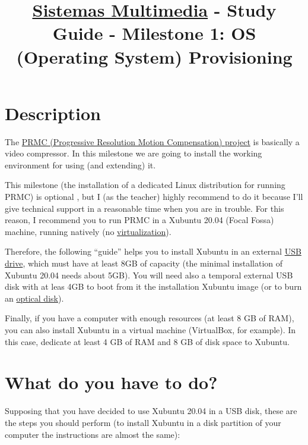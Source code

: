 \title{\href{http://cms.ual.es/UAL/estudios/masteres/plandeestudios/asignaturas/asignatura/MASTER7114?idAss=71142105&idTit=7114}{Sistemas Multimedia} - Study Guide - Milestone 1: OS (Operating System) Provisioning}

\maketitle

\section{Description}

The \href{https://github.com/Sistemas-Multimedia/PRMC/}{PRMC
  (Progressive Resolution Motion Compensation) project} is basically a
video compressor. In this milestone we are going to install the
working environment for using (and extending) it.

This milestone (the installation of a dedicated Linux distribution for
running PRMC) is optional , but I (as the teacher) highly
recommend to do it because I'll give technical support in a reasonable
time when you are in trouble. For this reason, I recommend you to run
PRMC in a Xubuntu 20.04 (Focal Fossa) \cite{xubuntu} machine,
running natively
(no \href{https://en.wikipedia.org/wiki/Virtualization}{virtualization}).

Therefore, the following ``guide'' helps you to install Xubuntu in an
external \href{https://en.wikipedia.org/wiki/USB_flash_drive}{USB
drive}, which must have at least 8GB of capacity (the minimal
installation of Xubuntu 20.04 needs about 5GB). You will need also a
temporal external USB disk with at leas 4GB to boot from it the
installation Xubuntu image (or to burn
an \href{https://en.wikipedia.org/wiki/Optical_disc}{optical disk}).

Finally, if you have a computer with enough resources (at least 8 GB
of RAM), you can also install Xubuntu in a virtual machine
(VirtualBox, for example). In this case, dedicate at least 4 GB of RAM
and 8 GB of disk space to Xubuntu.

\section{What do you have to do?}

Supposing that you have decided to use Xubuntu 20.04 in a USB disk,
these are the steps you should perform (to install Xubuntu in a disk
partition of your computer the instructions are almost the same):

